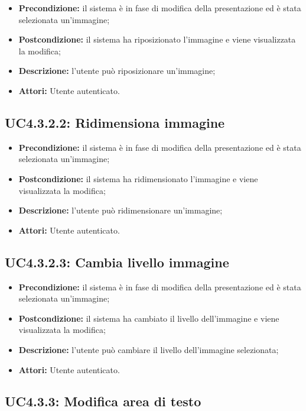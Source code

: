 \begin{itemize}
	\item \textbf{Precondizione:} il sistema è in fase di modifica della presentazione ed è stata selezionata un'immagine;
	\item \textbf{Postcondizione:} il sistema ha riposizionato l'immagine e viene visualizzata la modifica;
	\item \textbf{Descrizione:} l'utente può riposizionare un'immagine;
	\item \textbf{Attori:} Utente autenticato.
\end{itemize}
\subsection{ UC4.3.2.2: Ridimensiona immagine}

\begin{itemize}
	\item \textbf{Precondizione:} il sistema è in fase di modifica della presentazione ed è stata selezionata un'immagine;
	\item \textbf{Postcondizione:} il sistema ha ridimensionato l'immagine e viene visualizzata la modifica;
	\item \textbf{Descrizione:} l'utente può ridimensionare un'immagine;
	\item \textbf{Attori:} Utente autenticato.
\end{itemize}
\subsection{ UC4.3.2.3: Cambia livello immagine}

\begin{itemize}
	\item \textbf{Precondizione:} il sistema è in fase di modifica della presentazione ed è stata selezionata un'immagine;
	\item \textbf{Postcondizione:} il sistema ha cambiato il livello dell'immagine e viene visualizzata la modifica;
	\item \textbf{Descrizione:} l'utente può cambiare il livello dell'immagine selezionata;
	\item \textbf{Attori:} Utente autenticato.
\end{itemize}
\subsection{ UC4.3.3: Modifica area di testo}

